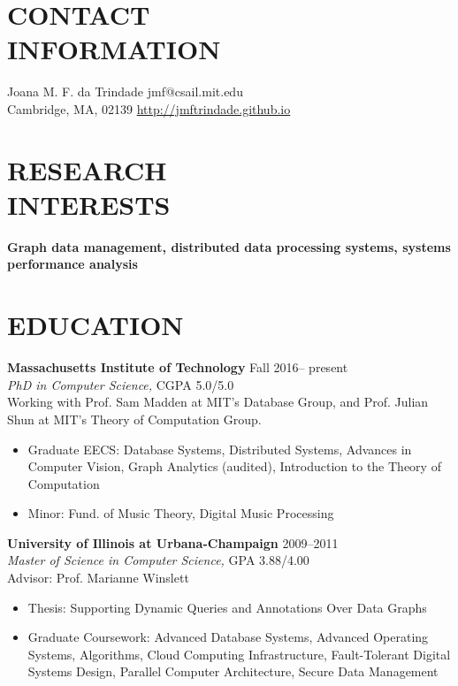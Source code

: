 \documentclass[line,margin]{res}
\begin{document}

\begin{resume}

\section{CONTACT \\ INFORMATION}  Joana M. F. da Trindade \hfill jmf@csail.mit.edu \\
  Cambridge, MA, 02139 \hfill \url{http://jmftrindade.github.io}

\section{RESEARCH \\ INTERESTS} \textbf{Graph data management, distributed data processing systems, systems performance analysis}

\section{EDUCATION} \textbf{Massachusetts Institute of Technology} \hfill Fall 2016-- present \\
  {\sl PhD in Computer Science,} CGPA 5.0/5.0 \\
  Working with Prof. Sam Madden at MIT's Database Group, and Prof. Julian Shun at MIT's Theory of Computation Group.
  \begin{itemize}  \itemsep -2pt
  \item Graduate EECS: Database Systems, Distributed Systems, Advances in Computer Vision, Graph Analytics (audited), Introduction to the Theory of Computation
  \item Minor: Fund. of Music Theory, Digital Music Processing
  \end{itemize}

  \textbf{University of Illinois at Urbana-Champaign} \hfill 2009--2011 \\
  {\sl Master of Science in Computer Science,}  GPA 3.88/4.00 \\
  Advisor: Prof. Marianne Winslett
  \begin{itemize}  \itemsep -2pt
  \item Thesis: Supporting Dynamic Queries and Annotations Over Data Graphs
  \item Graduate Coursework: Advanced Database Systems, Advanced Operating Systems, Algorithms, Cloud Computing Infrastructure, Fault-Tolerant Digital Systems Design, Parallel Computer Architecture, Secure Data Management
  \end{itemize}


\end{resume}
\end{document}
